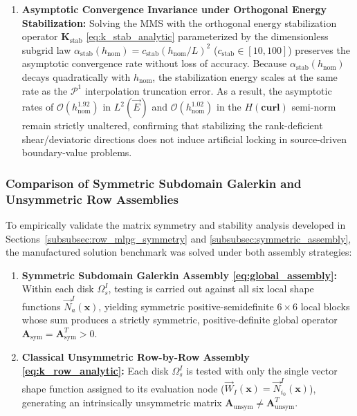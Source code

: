 \documentclass[preprint,12pt]{elsarticle}
\begin{document}
\begin{enumerate}
    \item \textbf{Asymptotic Convergence Invariance under Orthogonal Energy Stabilization:} Solving the MMS with the orthogonal energy stabilization operator $\mathbf{K}_{\mathrm{stab}}$ \eqref{eq:k_stab_analytic} parameterized by the dimensionless subgrid law $\alpha_{\mathrm{stab}}(h_{\mathrm{nom}}) = c_{\mathrm{stab}} (h_{\mathrm{nom}}/L)^2$ ($c_{\mathrm{stab}} \in [10, 100]$) preserves the asymptotic convergence rate without loss of accuracy. Because $\alpha_{\mathrm{stab}}(h_{\mathrm{nom}})$ decays quadratically with $h_{\mathrm{nom}}$, the stabilization energy scales at the same rate as the $\mathcal{P}^1$ interpolation truncation error. As a result, the asymptotic rates of $\mathcal{O}(h_{\mathrm{nom}}^{1.92})$ in $L^2(\vec{E})$ and $\mathcal{O}(h_{\mathrm{nom}}^{1.02})$ in the $H(\mathbf{curl})$ semi-norm remain strictly unaltered, confirming that stabilizing the rank-deficient shear/deviatoric directions does not induce artificial locking in source-driven boundary-value problems.
\end{enumerate}

\subsubsection{Comparison of Symmetric Subdomain Galerkin and Unsymmetric Row Assemblies}
\label{subsubsec:mms_assembly_comparison}

To empirically validate the matrix symmetry and stability analysis developed in Sections~\ref{subsubsec:row_mlpg_symmetry} and \ref{subsubsec:symmetric_assembly}, the manufactured solution benchmark was solved under both assembly strategies:
\begin{enumerate}
    \item \textbf{Symmetric Subdomain Galerkin Assembly \eqref{eq:global_assembly}:} Within each disk $\Omega_s^I$, testing is carried out against all six local shape functions $\vec{N}_a^I(\mathbf{x})$, yielding symmetric positive-semidefinite $6 \times 6$ local blocks whose sum produces a strictly symmetric, positive-definite global operator $\mathbf{A}_{\mathrm{sym}} = \mathbf{A}_{\mathrm{sym}}^T > 0$.
    \item \textbf{Classical Unsymmetric Row-by-Row Assembly \eqref{eq:k_row_analytic}:} Each disk $\Omega_s^I$ is tested with only the single vector shape function assigned to its evaluation node ($\vec{W}_I(\mathbf{x}) = \vec{N}_{i_0}^I(\mathbf{x})$), generating an intrinsically unsymmetric matrix $\mathbf{A}_{\mathrm{unsym}} \ne \mathbf{A}_{\mathrm{unsym}}^T$.
\end{enumerate}
\end{document}
